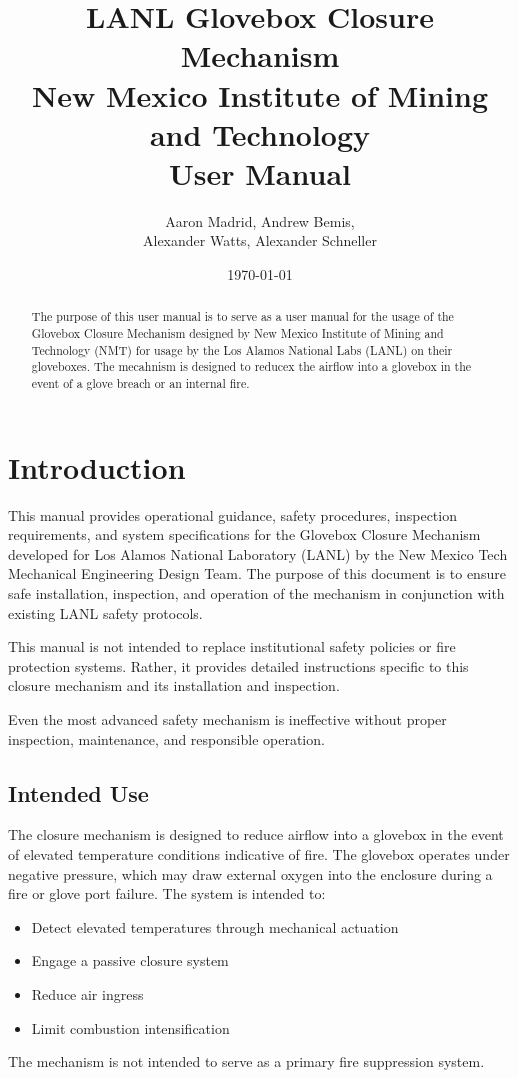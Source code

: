 \documentclass[12pt, a4paper]{report}
\title{\textbf{LANL Glovebox Closure Mechanism}\\ \Large New Mexico Institute of Mining and Technology \\ User Manual}
\author{Aaron Madrid, Andrew Bemis,\\Alexander Watts, Alexander Schneller}
\date{\today}
\begin{document}
\maketitle

\begin{abstract}
The purpose of this user manual is to serve as a user manual for the usage of the Glovebox Closure Mechanism designed by New Mexico Institute of Mining and Technology (NMT) for usage by the Los Alamos National Labs (LANL) on their gloveboxes. The mecahnism is designed to reducex the airflow into a glovebox in the event of a glove breach or an internal fire. 
\end{abstract}

\tableofcontents
\listoffigures
\listoftables

\chapter{Introduction}

This manual provides operational guidance, safety procedures, inspection requirements, and system specifications for the Glovebox Closure Mechanism developed for Los Alamos National Laboratory (LANL) by the New Mexico Tech Mechanical Engineering Design Team. The purpose of this document is to ensure safe installation, inspection, and operation of the mechanism in conjunction with existing LANL safety protocols.

This manual is not intended to replace institutional safety policies or fire protection systems. Rather, it provides detailed instructions specific to this closure mechanism and its installation and inspection. 

Even the most advanced safety mechanism is ineffective without proper inspection, maintenance, and responsible operation.

\section{Intended Use}

The closure mechanism is designed to reduce airflow into a glovebox in the event of elevated temperature conditions indicative of fire. The glovebox operates under negative pressure, which may draw external oxygen into the enclosure during a fire or glove port failure. The system is intended to:
    \begin{itemize}
        \item Detect elevated temperatures through mechanical actuation 
        \item Engage a passive closure system 
        \item Reduce air ingress 
        \item Limit combustion intensification 
    \end{itemize}
The mechanism is not intended to serve as a primary fire suppression system.
\end{document}
